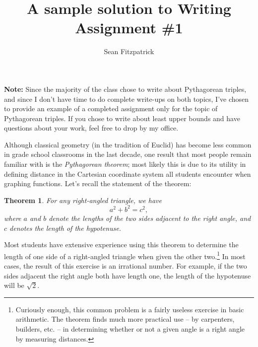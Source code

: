 \documentclass[letterpaper,12pt]{article}
\title{A sample solution to Writing Assignment \#1}
\author{Sean Fitzpatrick}
\newtheorem{theorem}{Theorem}
\theoremstyle{definition}
\begin{document}
 \maketitle

\textbf{Note:} Since the majority of the class chose to write about Pythagorean triples, and since I don't have time to do complete write-ups on both topics, I've chosen to provide an example of a completed assignment only for the topic of Pythagorean triples. If you chose to write about least upper bounds and have questions about your work, feel free to drop by my office.

\vspace{0.5in}

Although classical geometry (in the tradition of Euclid) has become less common in grade school classrooms in the last decade, one result that most people remain familiar with is the \textit{Pythagorean theorem}; most likely this is due to its utility in defining distance in the Cartesian coordinate system all students encounter when graphing functions. Let's recall the statement of the theorem:
\begin{theorem}
 For any right-angled triangle, we have
\[
 a^2+b^2=c^2,
\]
where $a$ and $b$ denote the lengths of the two sides adjacent to the right angle, and $c$ denotes the length of the hypotenuse.
\end{theorem}
Most students have extensive experience using this theorem to determine the length of one side of a right-angled triangle when given the other two.\footnote{Curiously enough, this common problem is a fairly useless exercise in basic arithmetic. The theorem finds much more practical use -- by carpenters, builders, etc. -- in determining whether or not a given angle is a right angle by measuring distances.} In most cases, the result of this exercise is an irrational number. For example, if the two sides adjacent the right angle both have length one, the length of the hypotenuse will be $\sqrt{2}$. 
\end{document}
